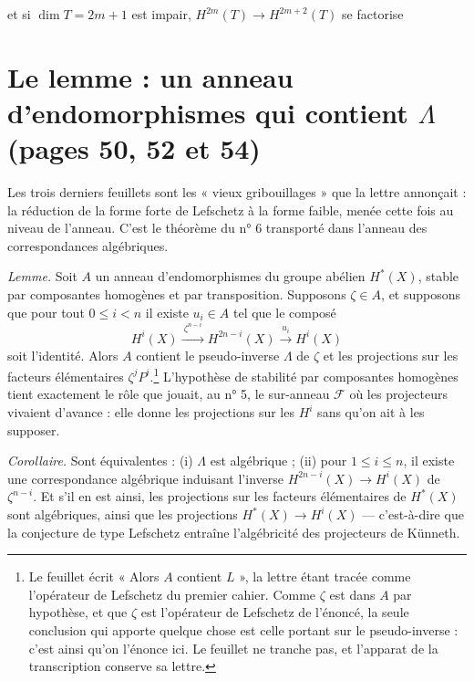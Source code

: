 \documentclass[11pt,a4paper]{article}
\begin{document}
et si $\dim T = 2m+1$ est impair, $H^{2m}(T) \to H^{2m+2}(T)$ se factorise


\section*{Le lemme : un anneau d'endomorphismes qui contient $\Lambda$ (pages 50, 52 et 54)}

Les trois derniers feuillets sont les « vieux gribouillages » que la lettre
annonçait : la réduction de la forme forte de Lefschetz à la forme faible,
menée cette fois au niveau de l'anneau. C'est le théorème du n° 6 transporté
dans l'anneau des correspondances algébriques.

\emph{Lemme.} Soit $A$ un anneau d'endomorphismes du groupe abélien
$H^{*}(X)$, stable par composantes homogènes et par transposition. Supposons
$\zeta \in A$, et supposons que pour tout $0 \leqslant i < n$ il existe
$u_{i} \in A$ tel que le composé
\[
H^{i}(X) \xrightarrow{\ \zeta^{n-i}\ } H^{2n-i}(X) \xrightarrow{\ u_{i}\ } H^{i}(X)
\]
soit l'identité. Alors $A$ contient le pseudo-inverse $\Lambda$ de $\zeta$ et
les projections sur les facteurs élémentaires
$\zeta^{j}P^{i}$.\footnote{Le feuillet écrit « Alors $A$ contient $L$ », la
lettre étant tracée comme l'opérateur de Lefschetz du premier cahier. Comme
$\zeta$ est dans $A$ par hypothèse, et que $\zeta$ est l'opérateur de Lefschetz
de l'énoncé, la seule conclusion qui apporte quelque chose est celle portant
sur le pseudo-inverse : c'est ainsi qu'on l'énonce ici. Le feuillet ne tranche
pas, et l'apparat de la transcription conserve sa lettre.} L'hypothèse de
stabilité par composantes homogènes tient exactement le rôle que jouait, au
n° 5, le sur-anneau $\mathcal{F}$ où les projecteurs vivaient d'avance : elle
donne les projections sur les $H^{i}$ sans qu'on ait à les supposer.

\emph{Corollaire.} Sont équivalentes : (i) $\Lambda$ est algébrique ; (ii) pour
$1 \leqslant i \leqslant n$, il existe une correspondance algébrique induisant
l'inverse $H^{2n-i}(X) \to H^{i}(X)$ de $\zeta^{n-i}$. Et s'il en est ainsi,
les projections sur les facteurs élémentaires de $H^{*}(X)$ sont algébriques,
ainsi que les projections $H^{*}(X) \to H^{i}(X)$ --- c'est-à-dire que la
conjecture de type Lefschetz entraîne l'algébricité des projecteurs de
Künneth.
\end{document}
